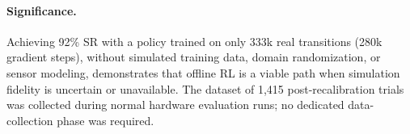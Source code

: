 \paragraph{Significance.}
Achieving 92\% SR with a policy trained on only 333k real
transitions (280k gradient steps), without simulated training data,
domain randomization, or sensor modeling, demonstrates that
offline RL is a viable path when simulation fidelity is uncertain
or unavailable. The dataset of 1,415 post-recalibration trials
was collected during normal hardware evaluation runs; no dedicated
data-collection phase was required.
